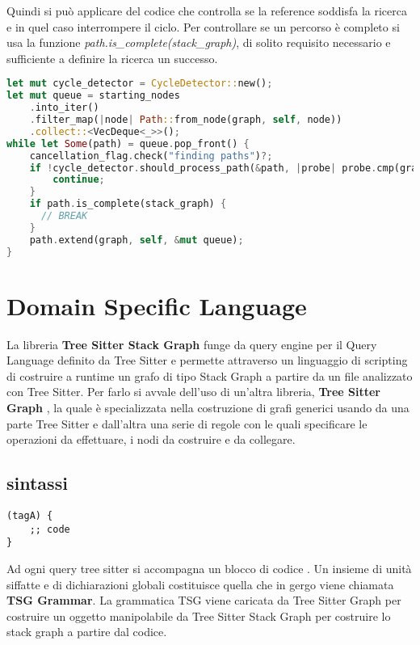 Quindi si pu\`o applicare del codice che controlla se la reference soddisfa la ricerca e in quel caso interrompere il ciclo. Per controllare se un percorso \`e completo si usa la funzione \emph{path.is\_complete(stack\_graph)}, di solito requisito necessario e sufficiente a definire la ricerca un successo.

\begin{lstlisting}[language=Rust]
let mut cycle_detector = CycleDetector::new();
let mut queue = starting_nodes
    .into_iter()
    .filter_map(|node| Path::from_node(graph, self, node))
    .collect::<VecDeque<_>>();
while let Some(path) = queue.pop_front() {
    cancellation_flag.check("finding paths")?;
    if !cycle_detector.should_process_path(&path, |probe| probe.cmp(graph, self, &path)) {
        continue;
    }
    if path.is_complete(stack_graph) {
      // BREAK
    }
    path.extend(graph, self, &mut queue);
}
\end{lstlisting}

\section{Domain Specific Language}

La libreria \textbf{Tree Sitter Stack Graph} \cite{TreeSitterStackGraph} funge da query engine per il Query Language definito da Tree Sitter e permette attraverso un linguaggio di scripting di costruire a runtime un grafo di tipo Stack Graph a partire da un file analizzato con Tree Sitter.
Per farlo si avvale dell'uso di un'altra libreria, \textbf{Tree Sitter Graph} \cite{TreeSitterGraph}, la quale \`e specializzata nella costruzione di grafi generici usando da una parte Tree Sitter e dall'altra una serie di regole con le quali specificare le operazioni da effettuare, i nodi da costruire e da collegare.

\subsection{sintassi}

\begin{lstlisting}
(tagA) {
    ;; code
}
\end{lstlisting}

Ad ogni query tree sitter si accompagna un blocco di codice \cite{TreeSitterGraphReferenceHighLevelStructure}.
Un insieme di unit\`a siffatte e di dichiarazioni globali costituisce quella che in gergo viene chiamata \textbf{TSG Grammar}.
La grammatica TSG viene caricata da Tree Sitter Graph per costruire un oggetto manipolabile da Tree Sitter Stack Graph per costruire lo stack graph a partire dal codice.

